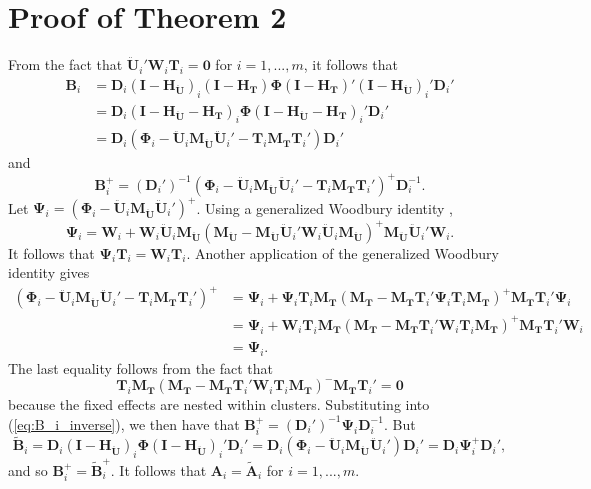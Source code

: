 \documentclass{article}\usepackage[]{graphicx}\usepackage[]{color}
\newcommand{\bm}{\mathbf}
\newcommand{\bs}{\boldsymbol}
\begin{document}
\section{Proof of Theorem 2}

From the fact that $\bm{\ddot{U}}_i'\bm{W}_i\bm{T}_i = \bm{0}$ for $i = 1,...,m$, it follows that \begin{align*}
\bm{B}_i &= \bm{D}_i \left(\bm{I} - \bm{H_{\ddot{U}}}\right)_i \left(\bm{I} - \bm{H_T}\right) \bs\Phi \left(\bm{I} - \bm{H_T}\right)' \left(\bm{I} - \bm{H_{\ddot{U}}}\right)_i' \bm{D}_i'\\
&= \bm{D}_i \left(\bm{I} - \bm{H_{\ddot{U}}} - \bm{H_T}\right)_i \bs\Phi \left(\bm{I} - \bm{H_{\ddot{U}}} - \bm{H_T}\right)_i' \bm{D}_i' \\
&= \bm{D}_i \left(\bs\Phi_i - \bm{\ddot{U}}_i \bm{M_{\ddot{U}}}\bm{\ddot{U}}_i' - \bm{T}_i \bm{M_T}\bm{T}_i'\right)\bm{D}_i'
\end{align*}
and 
\begin{equation}
\label{eq:B_i_inverse}
\bm{B}_i^+ = \left(\bm{D}_i'\right)^{-1} \left(\bs\Phi_i - \bm{\ddot{U}}_i \bm{M_{\ddot{U}}}\bm{\ddot{U}}_i' - \bm{T}_i \bm{M_T}\bm{T}_i'\right)^+ \bm{D}_i^{-1}.
\end{equation}
Let $\bs\Psi_i = \left(\bs\Phi_i - \bm{\ddot{U}}_i \bm{M_{\ddot{U}}}\bm{\ddot{U}}_i'\right)^+$.
Using a generalized Woodbury identity \citep{Henderson1981on}, \[
\bs\Psi_i = \bm{W}_i + \bm{W}_i \bm{\ddot{U}}_i \bm{M_{\ddot{U}}}\left(\bm{M_{\ddot{U}}} - \bm{M_{\ddot{U}}} \bm{\ddot{U}}_i' \bm{W}_i \bm{\ddot{U}}_i \bm{M_{\ddot{U}}}\right)^+ \bm{M_{\ddot{U}}}\bm{\ddot{U}}_i'\bm{W}_i. \]
It follows that $\bs\Psi_i \bm{T}_i = \bm{W}_i \bm{T}_i$. 
Another application of the generalized Woodbury identity gives 
\begin{align*}
\left(\bs\Phi_i - \bm{\ddot{U}}_i \bm{M_{\ddot{U}}}\bm{\ddot{U}}_i' - \bm{T}_i \bm{M_T}\bm{T}_i'\right)^+ &= \bs\Psi_i + \bs\Psi_i \bm{T}_i \bm{M_T}\left(\bm{M_T} - \bm{M_T}\bm{T}_i' \bs\Psi_i \bm{T}_i \bm{M_T}\right)^+ \bm{M_T} \bm{T}_i' \bs\Psi_i \\
&= \bs\Psi_i + \bm{W}_i \bm{T}_i \bm{M_T}\left(\bm{M_T} - \bm{M_T}\bm{T}_i' \bm{W}_i \bm{T}_i\bm{M_T}\right)^+ \bm{M_T} \bm{T}_i' \bm{W}_i \\
&= \bs\Psi_i.
\end{align*}
The last equality follows from the fact that \[
\bm{T}_i \bm{M_T}\left(\bm{M_T} - \bm{M_T}\bm{T}_i' \bm{W}_i \bm{T}_i\bm{M_T}\right)^{-} \bm{M_T} \bm{T}_i' = \bm{0} \]
because the fixed effects are nested within clusters. 
Substituting into (\ref{eq:B_i_inverse}), we then have that $\bm{B}_i^+ = \left(\bm{D}_i'\right)^{-1} \bs\Psi_i \bm{D}_i^{-1}$. 
But \[
\bm{\tilde{B}}_i = \bm{D}_i \left(\bm{I} - \bm{H_{\ddot{U}}}\right)_i \bs\Phi \left(\bm{I} - \bm{H_{\ddot{U}}}\right)_i' \bm{D}_i' = \bm{D}_i \left(\bs\Phi_i - \bm{\ddot{U}}_i\bm{M_{\ddot{U}}} \bm{\ddot{U}}_i'\right) \bm{D}_i' = \bm{D}_i \bs\Psi_i^+ \bm{D}_i',
\]
and so $\bm{B}_i^+ = \bm{\tilde{B}}_i^+$. It follows that $\bm{A}_i = \bm{\tilde{A}}_i$ for $i = 1,...,m$. 
\end{document}
